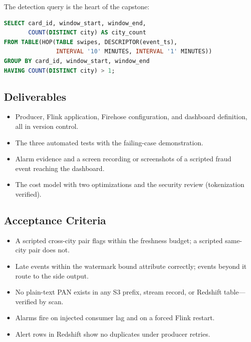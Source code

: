 The detection query is the heart of the capstone:

\begin{lstlisting}[language=SQL,caption={Two-cities-in-ten-minutes detection with a hopping window.},label={lst:ch16-fraud-sql}]
SELECT card_id, window_start, window_end,
       COUNT(DISTINCT city) AS city_count
FROM TABLE(HOP(TABLE swipes, DESCRIPTOR(event_ts),
               INTERVAL '10' MINUTES, INTERVAL '1' MINUTES))
GROUP BY card_id, window_start, window_end
HAVING COUNT(DISTINCT city) > 1;
\end{lstlisting}

\subsection*{Deliverables}
\begin{itemize}
    \item Producer, Flink application, Firehose configuration, and dashboard definition, all in version control.
    \item The three automated tests with the failing-case demonstration.
    \item Alarm evidence and a screen recording or screenshots of a scripted fraud event reaching the dashboard.
    \item The cost model with two optimizations and the security review (tokenization verified).
\end{itemize}

\subsection*{Acceptance Criteria}
\begin{itemize}
    \item A scripted cross-city pair flags within the freshness budget; a scripted same-city pair does not.
    \item Late events within the watermark bound attribute correctly; events beyond it route to the side output.
    \item No plain-text PAN exists in any S3 prefix, stream record, or Redshift table---verified by scan.
    \item Alarms fire on injected consumer lag and on a forced Flink restart.
    \item Alert rows in Redshift show no duplicates under producer retries.
\end{itemize}

